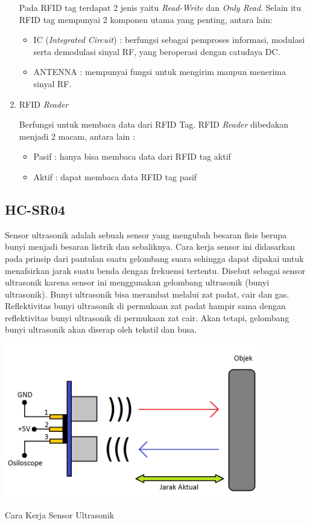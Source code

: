 \begin{enumerate}[topsep=0pt,itemsep=0pt,partopsep=0pt, parsep=0pt]
    Pada RFID tag terdapat 2 jenis yaitu \textit{Read-Write} dan \textit{Only Read}. Selain itu RFID tag mempunyai 2 komponen utama yang penting, antara lain:

    \begin{itemize}[topsep=0pt,itemsep=0pt,partopsep=0pt, parsep=0pt,]
        \item IC (\textit{Integrated Circuit}) : berfungsi sebagai pemproses informasi, modulasi serta demodulasi sinyal RF, yang beroperasi dengan catudaya DC.
        \item ANTENNA : mempunyai fungsi untuk mengirim maupun menerima sinyal RF.
    \end{itemize}

    \item RFID \textit{Reader}
    
    Berfungsi untuk membaca data dari RFID Tag. RFID \textit{Reader} dibedakan menjadi 2 macam, antara lain :
    \begin{itemize}[topsep=0pt,itemsep=0pt,partopsep=0pt, parsep=0pt,]
        \item Pasif : hanya bisa membaca data dari RFID tag aktif
        \item Aktif : dapat membaca data RFID tag pasif
    \end{itemize}
\end{enumerate}

\subsection{HC-SR04}
Sensor ultrasonik adalah sebuah sensor yang mengubah besaran fisis berupa bunyi menjadi besaran listrik dan sebaliknya. Cara kerja sensor ini didasarkan pada prinsip dari pantulan suatu gelombang suara sehingga dapat dipakai untuk menafsirkan jarak suatu benda dengan frekuensi tertentu. Disebut sebagai sensor ultrasonik karena sensor ini menggunakan gelombang ultrasonik (bunyi ultrasonik). Bunyi ultrasonik bisa merambat melalui zat padat, cair dan gas. Reflektivitas bunyi ultrasonik di permukaan zat padat hampir sama dengan reflektivitas bunyi ultrasonik di permukaan zat cair. Akan tetapi, gelombang bunyi ultrasonik akan diserap oleh tekstil dan busa.

\begin{afigure} 
    \includegraphics[width=0.85\textwidth, center]{images/cara kerja ultrasonik.png}
    \caption{Cara Kerja Sensor Ultrasonik}
    \label{fig:caraKerjaUltrasonic}
\end{afigure}

